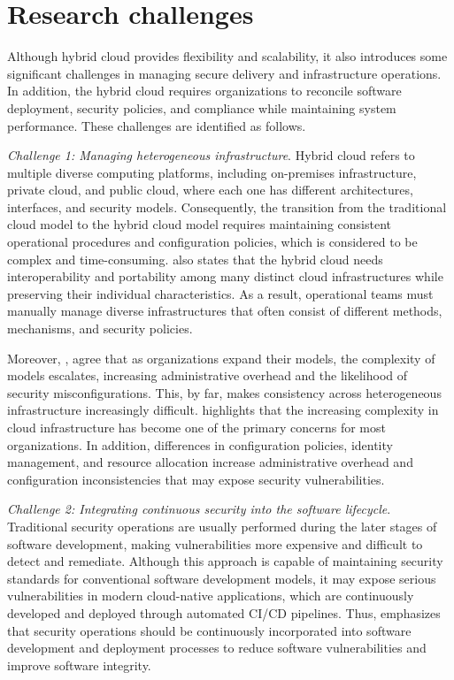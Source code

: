 \section{Research challenges}
\label{sec:Challenges}

Although hybrid cloud provides flexibility and scalability, it also introduces some significant challenges in managing secure delivery and infrastructure operations. In addition, the hybrid cloud requires organizations to reconcile software deployment, security policies, and compliance while maintaining system performance. These challenges are identified as follows.

\vspace{0.3cm}

\textit{Challenge 1: Managing heterogeneous infrastructure}.
Hybrid cloud refers to multiple diverse computing platforms, including on-premises infrastructure, private cloud, and public cloud, where each one has different architectures, interfaces, and security models. Consequently, the transition from the traditional cloud model to the hybrid cloud model requires maintaining consistent operational procedures and configuration policies, which is considered to be complex and time-consuming. \cite{Liu2011NISTRA} also states that the hybrid cloud needs interoperability and portability among many distinct cloud infrastructures while preserving their individual characteristics. As a result, operational teams must manually manage diverse infrastructures that often consist of different methods, mechanisms, and security policies.

Moreover, \cite{Flexera2025StateCloud}, \cite{HashiCorp2025StateCloud} agree that as organizations expand their models, the complexity of models escalates, increasing administrative overhead and the likelihood of security misconfigurations. This, by far, makes consistency across heterogeneous infrastructure increasingly difficult. \cite{HashiCorp2025StateCloud} highlights that the increasing complexity in cloud infrastructure has become one of the primary concerns for most organizations. In addition, differences in configuration policies, identity management, and resource allocation increase administrative overhead and configuration inconsistencies that may expose security vulnerabilities.

\vspace{0.3cm}

\textit{Challenge 2: Integrating continuous security into the software lifecycle}.
Traditional security operations are usually performed during the later stages of software development, making vulnerabilities more expensive and difficult to detect and remediate. Although this approach is capable of maintaining security standards for conventional software development models, it may expose serious vulnerabilities in modern cloud-native applications, which are continuously developed and deployed through automated CI/CD pipelines. Thus, \cite{NISTSSDF2022} emphasizes that security operations should be continuously incorporated into software development and deployment processes to reduce software vulnerabilities and improve software integrity.

